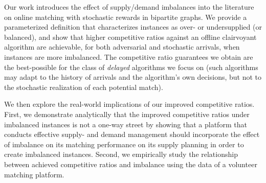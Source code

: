 Our work introduces the effect of supply/demand imbalances into the literature on online matching with stochastic rewards in bipartite graphs. We provide a parameterized definition that characterizes instances as over- or undersupplied (or balanced), and show that higher competitive ratios against an offline clairvoyant algorithm are achievable, for both adversarial and stochastic arrivals, when instances are more imbalanced. The competitive ratio guarantees we obtain are the best-possible for the class of \emph{delayed} algorithms we focus on (such algorithms may adapt to the history of arrivals and the algorithm's own decisions, but not to the stochastic realization of each potential match). 

We then explore the real-world implications of our improved competitive ratios. First, we demonstrate analytically that the improved competitive ratios under imbalanced instances is not a one-way street by showing that a platform that conducts effective supply- and demand management should incorporate the effect of imbalance on its matching performance on its supply planning in order to create imbalanced instances. Second, we empirically study the relationship between achieved competitive ratios and imbalance using the data of a volunteer matching platform.